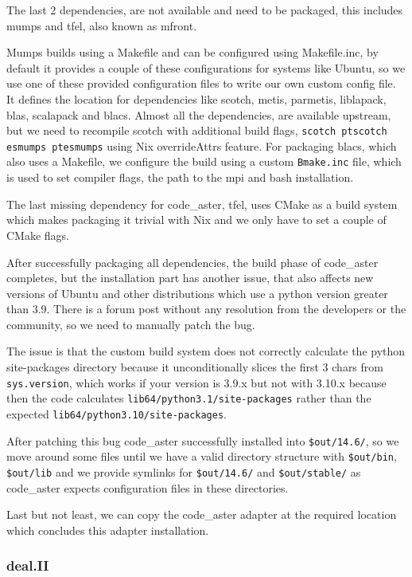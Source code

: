 \documentclass[conference,final,a4paper]{IEEEtran}
\begin{document}
The last 2 dependencies, are not available and need to be packaged, this includes mumps and tfel, also known as mfront.

Mumps builds using a Makefile and can be configured using Makefile.inc, by default it provides a couple of these configurations for systems like Ubuntu, so we use one of these provided configuration files to write our own custom config file.
It defines the location for dependencies like scotch, metis, parmetis, liblapack, blas, scalapack and blacs.
Almost all the dependencies, are available upstream, but we need to recompile scotch with additional build flags, \texttt{scotch ptscotch esmumps ptesmumps} using Nix overrideAttrs feature.
For packaging blacs, which also uses a Makefile, we configure the build using a custom \texttt{Bmake.inc} file, which is used to set compiler flags, the path to the mpi and bash installation.

The last missing dependency for code\_aster, tfel, uses CMake as a build system which makes packaging it trivial with Nix and we only have to set a couple of CMake flags.

After successfully packaging all dependencies, the build phase of code\_aster completes, but the installation part has another issue, that also affects new versions of Ubuntu and other distributions which use a python version greater than 3.9.
There is a forum post without any resolution from the developers or the community, so we need to manually patch the bug.

The issue is that the custom build system does not correctly calculate the python site-packages directory because it unconditionally slices the first 3 chars from \texttt{sys.version}, which works if your version is 3.9.x but not with 3.10.x because then the code calculates \texttt{lib64/python3.1/site-packages} rather than the expected \texttt{lib64/python3.10/site-packages}.

After patching this bug code\_aster successfully installed into \texttt{\$out/14.6/}, so we move around some files until we have a valid directory structure with \texttt{\$out/bin}, \texttt{\$out/lib} and we provide symlinks for \texttt{\$out/14.6/} and \texttt{\$out/stable/} as code\_aster expects configuration files in these directories.

Last but not least, we can copy the code\_aster adapter at the required location which concludes this adapter installation.\\

\subsubsection{deal.II}
\end{document}
